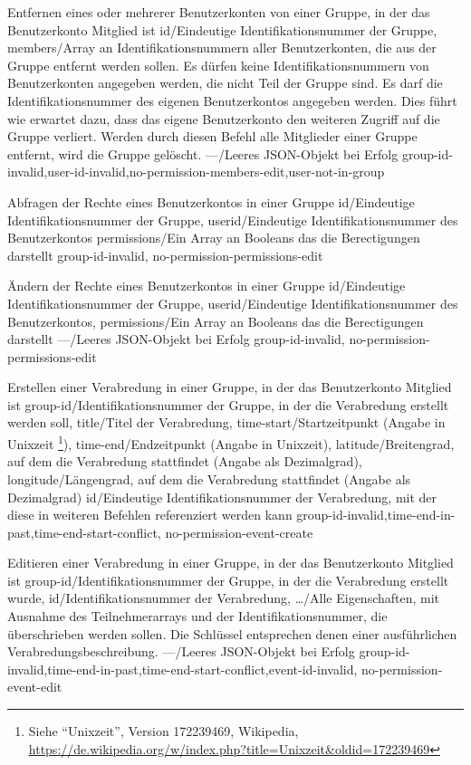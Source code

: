 \documentclass[parskip=full,11pt]{scrartcl}
\begin{document}
{Entfernen eines oder mehrerer Benutzerkonten von einer Gruppe, in der das
Benutzerkonto Mitglied ist}
{id/Eindeutige Identifikationsnummer der Gruppe,
members/Array an Identifikationsnummern aller Benutzerkonten{,} die aus der
Gruppe entfernt werden sollen.
Es dürfen keine Identifikationsnummern von Benutzerkonten angegeben werden{,}
die nicht Teil der Gruppe sind.
Es darf die Identifikationsnummer des eigenen Benutzerkontos angegeben werden.
Dies führt wie erwartet dazu{,} dass das eigene Benutzerkonto den weiteren
Zugriff auf die Gruppe verliert.
Werden durch diesen Befehl alle Mitglieder einer Gruppe entfernt{,} wird die
Gruppe gelöscht.}
{---/Leeres JSON-Objekt bei Erfolg}
{group-id-invalid,user-id-invalid,no-permission-members-edit,user-not-in-group}

{Abfragen der Rechte eines Benutzerkontos in einer Gruppe}
{id/Eindeutige Identifikationsnummer der Gruppe,
userid/Eindeutige Identifikationsnummer des Benutzerkontos}
{permissions/Ein Array an Booleans das die Berectigungen darstellt}
{group-id-invalid, no-permission-permissions-edit}

{Ändern der Rechte eines Benutzerkontos in einer Gruppe}
{id/Eindeutige Identifikationsnummer der Gruppe,
userid/Eindeutige Identifikationsnummer des Benutzerkontos,
permissions/Ein Array an Booleans das die Berectigungen darstellt}
{---/Leeres JSON-Objekt bei Erfolg}
{group-id-invalid, no-permission-permissions-edit}

{Erstellen einer Verabredung in einer Gruppe, in der das Benutzerkonto Mitglied
ist}
{group-id/Identifikationsnummer der Gruppe{,} in der die Verabredung erstellt
werden soll,
title/Titel der Verabredung,
time-start/Startzeitpunkt (Angabe in Unixzeit%
\footnote{Siehe \enquote{Unixzeit}, Version 172239469, Wikipedia,\\
\url{https://de.wikipedia.org/w/index.php?title=Unixzeit&oldid=172239469}}),
time-end/Endzeitpunkt (Angabe in Unixzeit),
latitude/Breitengrad{,} auf dem die Verabredung stattfindet (Angabe als
Dezimalgrad),
longitude/Längengrad{,} auf dem die Verabredung stattfindet (Angabe als
Dezimalgrad)}
{id/Eindeutige Identifikationsnummer der Verabredung{,} mit der diese in
weiteren Befehlen referenziert werden kann}
{group-id-invalid,time-end-in-past,time-end-start-conflict,
no-permission-event-create}

{Editieren einer Verabredung in einer Gruppe, in der das Benutzerkonto Mitglied
ist}
{group-id/Identifikationsnummer der Gruppe{,} in der die Verabredung erstellt
wurde,
id/Identifikationsnummer der Verabredung,
\dots/Alle Eigenschaften{,} mit Ausnahme des Teilnehmerarrays und der
Identifikationsnummer{,} die überschrieben werden sollen.
Die Schlüssel entsprechen denen einer ausführlichen Verabredungsbeschreibung.}
{---/Leeres JSON-Objekt bei Erfolg}
{group-id-invalid,time-end-in-past,time-end-start-conflict,event-id-invalid,%
no-permission-event-edit}
\end{document}
